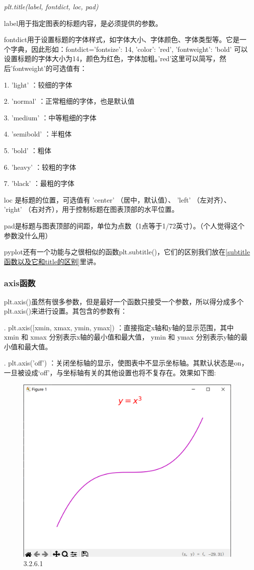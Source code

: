 \documentclass[12pt]{article}
\begin{document}
\textit{\large plt.title(label, fontdict, loc, pad)}

\noindent label用于指定图表的标题内容，是必须提供的参数。

\noindent fontdict用于设置标题的字体样式，如字体大小、字体颜色、字体类型等。它是一个字典，因此形如：fontdict={'fontsize': 14, 'color': 'red', 'fontweight': 'bold'}  可以设置标题的字体大小为14，颜色为红色，字体加粗。'red'这里可以简写，然后'fontweight'的可选值有：

1.   'light'  ：较细的字体

2.   'normal'  ：正常粗细的字体，也是默认值

3.   'medium'  ：中等粗细的字体

4.   'semibold'  ：半粗体

5.   'bold'  ：粗体

6.   'heavy'  ：较粗的字体

7.   'black'  ：最粗的字体

\noindent loc 是标题的位置，可选值有 'center'  （居中，默认值）、  'left'  （左对齐）、  'right'  （右对齐），用于控制标题在图表顶部的水平位置。

\noindent pad是标题与图表顶部的间距，单位为点数（1点等于1/72英寸）。（个人觉得这个参数没什么用）

pyplot还有一个功能与之很相似的函数plt.subtitle()，它们的区别我们放在\ref{subtitle函数以及它和title的区别}里讲。
\subsubsection{axis函数}

plt.axis()虽然有很多参数，但是最好一个函数只接受一个参数，所以得分成多个plt.axis()来进行设置。其包含的参数有：

 . plt.axis([xmin, xmax, ymin, ymax])  ：直接指定x轴和y轴的显示范围，其中  xmin  和  xmax  分别表示x轴的最小值和最大值，  ymin  和  ymax  分别表示y轴的最小值和最大值。

 . plt.axis('off')  ：关闭坐标轴的显示，使图表中不显示坐标轴。其默认状态是on，一旦被设成‘off’，与坐标轴有关的其他设置也将不复存在。效果如下图:
 \begin{figure}[H]
     \centering
     \includegraphics[width=0.45\linewidth]{pyplot坐标轴Pic2.png}
     \caption{3.2.6.1}
     \label{fig:enter-label}
 \end{figure}
\end{document}
